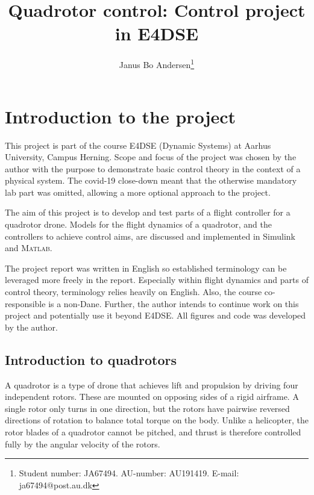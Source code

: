 \documentclass[a4paper]{report}
\author{Janus Bo Andersen\thanks{Student number: JA67494. AU-number: AU191419. E-mail: ja67494@post.au.dk}}
\newcommand{\MATLAB}{\textsc{Matlab}}
\begin{document}
\title{Quadrotor control: Control project in E4DSE}
\maketitle

\tableofcontents

\newpage
\printglossaries

\newpage
{}


\chapter{Introduction to the project}

This project is part of the course E4DSE (Dynamic Systems) at Aarhus University, Campus Herning.
Scope and focus of the project was chosen by the author with the purpose to demonstrate basic control theory in the context of a physical system.
The covid-19 close-down meant that the otherwise mandatory lab part was omitted, allowing a more optional approach to the project.

The aim of this project is to develop and test parts of a flight controller for a quadrotor drone.
Models for the flight dynamics of a quadrotor, and the controllers to achieve control aims, are discussed and implemented in Simulink and \MATLAB.

The project report was written in English so established terminology can be leveraged more freely in the report. 
Especially within flight dynamics and parts of control theory, terminology relies heavily on English.
Also, the course co-responsible is a non-Dane.
Further, the author intends to continue work on this project and potentially use it beyond E4DSE.
All figures and code was developed by the author.


\section{Introduction to quadrotors}

A quadrotor is a type of drone that achieves lift and propulsion by driving four independent rotors. 
These are mounted on opposing sides of a rigid airframe.
A single rotor only turns in one direction, but the rotors have pairwise reversed directions of rotation to balance total torque on the body.
Unlike a helicopter, the rotor blades of a quadrotor cannot be pitched, and thrust is therefore controlled fully by the angular velocity of the rotors.
\end{document}
